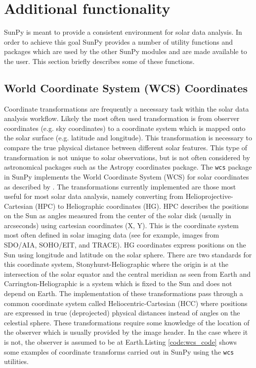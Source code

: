 \section{Additional functionality}
SunPy is meant to provide a consistent environment for solar data analysis. In 
order to achieve this goal SunPy provides a number of utility functions and packages which 
are used by the other SunPy modules and are made available to the user. This section 
briefly describes some of these functions.

	
\subsection{World Coordinate System (WCS) Coordinates}
Coordinate transformations are frequently a necessary task within the solar 
data analysis workflow. Likely the most often used transformation is from 
observer coordinates (e.g. sky coordinates) to a coordinate system which is 
mapped onto the solar surface (e.g. latitude and longitude). This 
transformation is necessary to compare the true physical distance between 
different solar features. This type of transformation is not unique
to solar observations, but is not often considered by astronomical packages
such as the Astropy 
coordinates package. The \verb|wcs| package in SunPy implements the World Coordinate 
System (WCS) for solar coordinates as described by \cite{Thompson2000}. The 
transformations currently implemented are those most useful 
for most solar data analysis, namely converting from Helioprojective-Cartesian 
(HPC) to Heliographic coordinates (HG). HPC describes the positions on 
the Sun as angles measured from the center of the solar disk (usually in 
arcseconds) using cartesian coordinates (X, Y). This is the coordinate system 
most often defined in solar imaging data (see for example, images from SDO/AIA, SOHO/EIT, and TRACE). 
HG coordinates express positions on the Sun using longitude and latitude on 
the solar sphere. There are two standards for this coordinate system, 
Stonyhurst-Heliographic where the origin is at the intersection of the solar 
equator and the central meridian as seen from Earth and 
Carrington-Heliographic is a system which is fixed to the Sun and does not depend on Earth. The 
implementation of these transformations pass through a common coordinate system 
called Heliocentric-Cartesian (HCC) where positions are expressed in true 
(deprojected) physical distances instead of angles on the celestial sphere.
These transformations require some knowledge of the location of the observer 
which is usually provided by the image header. In the case where it is 
not, the observer is assumed to be at Earth.Listing \ref{code:wcs_code} shows some examples of coordinate transforms carried out in SunPy using the \verb|wcs| utilities. 

